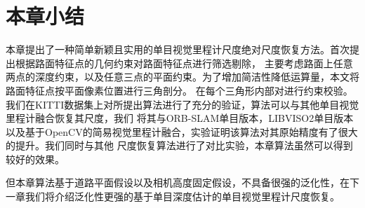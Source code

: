 \section{本章小结}
\label{sec:mvosr_conclusion}
本章提出了一种简单新颖且实用的单目视觉里程计尺度绝对尺度恢复方法。首次提出根据路面特征点的几何约束对路面特征点进行筛选剔除，
主要考虑路面上任意两点的深度约束，以及任意三点的平面约束。为了增加简洁性降低运算量，本文将路面特征点按平面像素位置进行三角剖分。
在每个三角形内部对进行约束校验。我们在KITTI数据集上对所提出算法进行了充分的验证，算法可以与其他单目视觉里程计融合恢复其尺度，我们
将其与ORB-SLAM单目版本，LIBVISO2单目版本以及基于OpenCV的简易视觉里程计融合，实验证明该算法对其原始精度有了很大的提升。我们同时与其他
尺度恢复算法进行了对比实验，本章算法虽然可以得到较好的效果。

但本章算法基于道路平面假设以及相机高度固定假设，不具备很强的泛化性，在下一章我们将介绍泛化性更强的基于单目深度估计的单目视觉里程计尺度恢复。